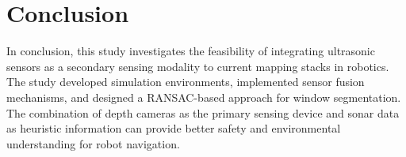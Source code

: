 \section{Conclusion}
\label{sec:conclusion}
In conclusion, this study investigates the feasibility of integrating ultrasonic sensors as a secondary sensing modality to current mapping stacks in robotics. The study developed simulation environments, implemented sensor fusion mechanisms, and designed a RANSAC-based approach for window segmentation. The combination of depth cameras as the primary sensing device and sonar data as heuristic information can provide better safety and environmental understanding for robot navigation.